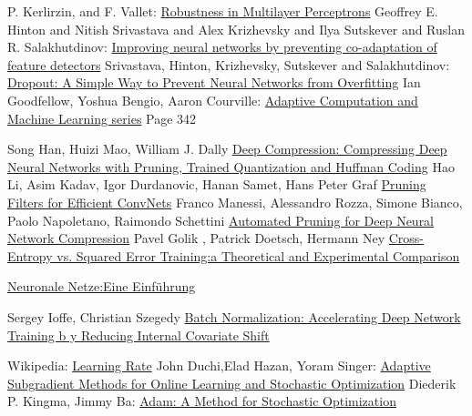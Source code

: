 \documentclass[12pt,a4paper]{scrartcl}
\numberwithin{equation}{section}
\begin{document}
\begin{thebibliography}{lem00}
	P. Kerlirzin, and F. Vallet: \href{ https://www.mitpressjournals.org/doi/abs/10.1162/neco.1993.5.3.473?journalCode=neco} {Robustness in Multilayer Perceptrons}
 	Geoffrey E. Hinton and Nitish Srivastava and Alex Krizhevsky and Ilya Sutskever and Ruslan R. Salakhutdinov: \href{https://arxiv.org/abs/1207.0580}{Improving neural networks by preventing co-adaptation of feature detectors}
 	Srivastava, Hinton, Krizhevsky, Sutskever and Salakhutdinov: \href{http://jmlr.org/papers/volume15/srivastava14a.old/srivastava14a.pdf}{Dropout: A Simple Way to Prevent Neural Networks from Overfitting}
Ian Goodfellow, Yoshua Bengio, Aaron Courville:
\href{https://www.amazon.com/Deep-Learning-Adaptive-Computation-Machine/dp/0262035618/ref=as_li_ss_tl?ieTF8&qid=1548018253&sr=8-3&keywords=deep+learning&linkCode=sl1&tag=inspiredalgor-20&linkId=49b3b1cce7e04bb3c9b99f2d878bf805&language=en_US}{Adaptive Computation and Machine Learning series} Page 342
 
	 Song Han, Huizi Mao, William J. Dally \href{https://arxiv.org/abs/1510.00149}{Deep Compression: Compressing Deep Neural Networks with Pruning, Trained Quantization and Huffman Coding}
 	Hao Li, Asim Kadav, Igor Durdanovic, Hanan Samet, Hans Peter Graf
 	\href{https://arxiv.org/abs/1608.08710}{Pruning Filters for Efficient ConvNets}
      Franco Manessi, Alessandro Rozza, Simone Bianco, Paolo Napoletano, Raimondo Schettini \href{https://arxiv.org/abs/1712.01721}{Automated Pruning for Deep Neural Network Compression}
 	 Pavel Golik , Patrick Doetsch, Hermann Ney
 	\href{http://books.jackon.me/Cross-Entropy-vs-Squared-Error-Training-a-Theoretical-and-Experimental-Comparison.pdf}{Cross-Entropy vs. Squared Error Training:a Theoretical and Experimental Comparison}
 	
 	\href{http://www.neuronalesnetz.de/aktivitaet.html}{Neuronale Netze:Eine Einführung}
 	
	Sergey Ioffe, Christian Szegedy
 	\href{https://arxiv.org/pdf/1502.03167.pdf}{Batch Normalization: Accelerating Deep Network Training b
 		y
 		Reducing Internal Covariate Shift}

	Wikipedia:
		\href{https://en.wikipedia.org/wiki/Learning_rate}{Learning Rate}
		John Duchi,Elad Hazan, Yoram Singer:
		\href{http://www.jmlr.org/papers/volume12/duchi11a/duchi11a.pdf}{Adaptive Subgradient Methods for
			Online Learning and Stochastic Optimization}
		Diederik P. Kingma, Jimmy Ba:
		\href{https://arxiv.org/abs/1412.6980}{Adam: A Method for Stochastic Optimization}
		

\end{thebibliography}
\end{document}
